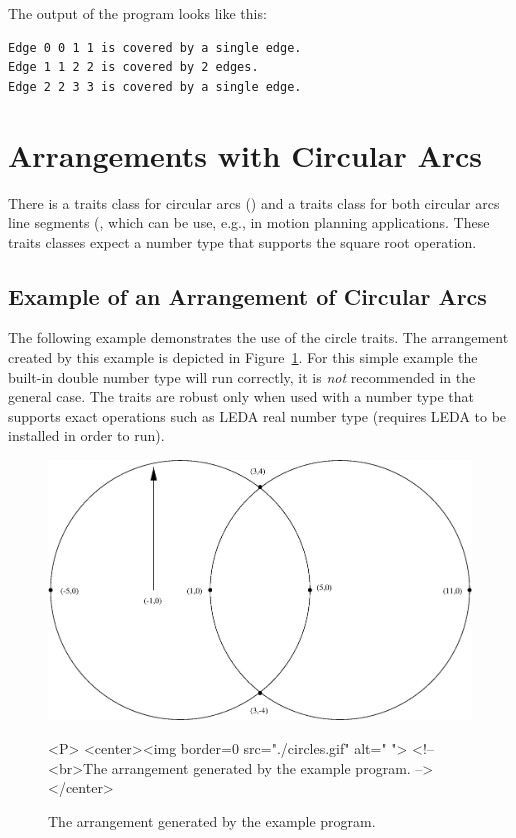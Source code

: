
The output of the program looks like this:
\begin{verbatim}
Edge 0 0 1 1 is covered by a single edge.
Edge 1 1 2 2 is covered by 2 edges.
Edge 2 2 3 3 is covered by a single edge.
\end{verbatim}

\section{Arrangements with Circular Arcs}

There is a traits class for circular arcs
() and a traits class for both
circular arcs  line segments
(, which can be use, e.g., in
motion planning applications. These traits classes expect a number type
that supports the square root operation.

\subsection{Example of an Arrangement of Circular Arcs}
\label{ssec:example3}
The following example demonstrates the use of the circle traits.
The arrangement created by this example is depicted in
Figure~\ref{fig:circles}.
For this simple example the built-in double
number type will run correctly, it is {\em not} recommended
in the general case. 
The traits are robust only when used with a
number type that supports exact  operations such as LEDA real number type (requires LEDA to be installed
in order to run). 
\begin{figure}[h]
\begin{ccTexOnly}
{\centering \resizebox*{0.8\textwidth}{0.33\textheight}%
{\includegraphics{circles.eps}}}
\end{ccTexOnly}
\caption{The arrangement generated by the example program.\label{fig:circles}}
\begin{ccHtmlOnly}
<P>
<center><img border=0 src="./circles.gif" alt=" ">
<!-- <br>The arrangement generated by the example program. -->
</center>
\end{ccHtmlOnly}
\end{figure}

